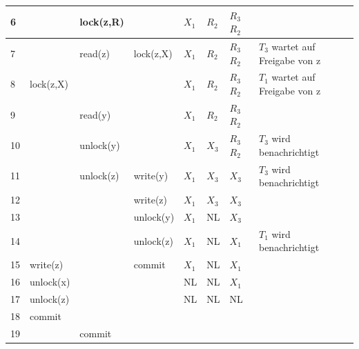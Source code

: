 \documentclass{article}
\begin{document}
\begin{enumerate}
\begin{tabular}{|p{1.5cm}|p{1.5cm}|p{1.5cm}|p{1.5cm}|p{0.5cm}|p{0.5cm}|p{0.5cm}|p{2.5cm}|}
                6           &             & lock(z,R)   &             & $X_1$ & $R_2$ & $R_3$ $R_2$ & \\ \hline
                7           &             & read(z)     & lock(z,X)   & $X_1$ & $R_2$ & $R_3$ $R_2$ & $T_3$ wartet auf Freigabe von z\\ \hline
                8           & lock(z,X)   &             &             & $X_1$ & $R_2$ & $R_3$ $R_2$ & $T_1$ wartet auf Freigabe von z\\ \hline
                9           &             & read(y)     &             & $X_1$ & $R_2$ & $R_3$ $R_2$ & \\ \hline
                10          &             & unlock(y)   &             & $X_1$ & $X_3$ & $R_3$ $R_2$ & $T_3$ wird benachrichtigt\\ \hline
                11          &             & unlock(z)   & write(y)    & $X_1$ & $X_3$ & $X_3$ & $T_3$ wird benachrichtigt\\ \hline
                12          &             &             & write(z)    & $X_1$ & $X_3$ & $X_3$ & \\ \hline
                13          &             &             & unlock(y)   & $X_1$ & NL    & $X_3$ & \\ \hline
                14          &             &             & unlock(z)   & $X_1$ & NL    & $X_1$ & $T_1$ wird benachrichtigt \\ \hline
                15          & write(z)    &             & commit      & $X_1$ & NL    & $X_1$ & \\ \hline
                16          & unlock(x)   &             &             & NL    & NL    & $X_1$ & \\ \hline
                17          & unlock(z)   &             &             & NL    & NL    & NL    & \\ \hline
                18          & commit      &             &             &       &       &       & \\ \hline
                19          &             & commit      &             &       &       &       & \\ \hline
        \end{tabular}
    \end{enumerate}
\end{document}

